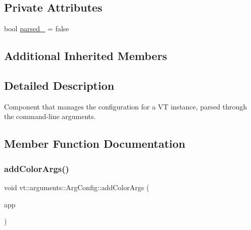 \subsection*{Private Attributes}
\begin{DoxyCompactItemize}
\item 
bool \hyperlink{structvt_1_1arguments_1_1_arg_config_a710f4894651d38778f924c5d5f340d96}{parsed\+\_\+} = false
\end{DoxyCompactItemize}
\subsection*{Additional Inherited Members}


\subsection{Detailed Description}
Component that manages the configuration for a VT instance, parsed through the command-\/line arguments. 

\subsection{Member Function Documentation}
\mbox{\label{structvt_1_1arguments_1_1_arg_config_a88f975427c3408ac8ada2add79fb9692}} 
\subsubsection{\texorpdfstring{add\+Color\+Args()}{addColorArgs()}}
{\footnotesize\ttfamily void vt\+::arguments\+::\+Arg\+Config\+::add\+Color\+Args (\begin{DoxyParamCaption}\item[{C\+L\+I\+::\+App \&}]{app }\end{DoxyParamCaption})\hspace{0.3cm}{\ttfamily [private]}}

\mbox{\label{structvt_1_1arguments_1_1_arg_config_a05ce6db9c65585991e2e6e2d741b9dc7}} 
